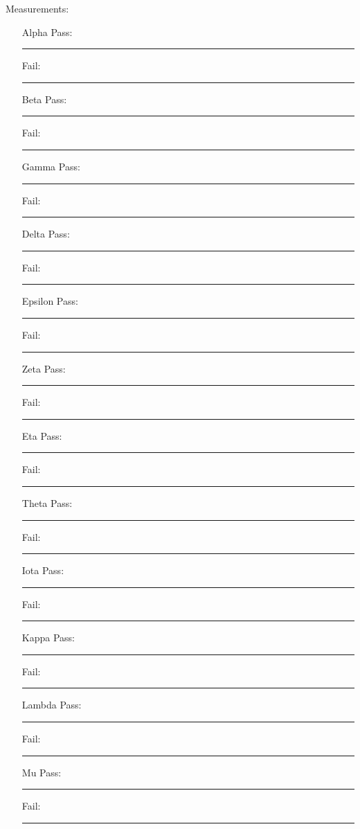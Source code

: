 \pagebreak
{\Large Measurements: }\\
\begin{enumerate}
\item[Alpha] \hfill Pass: \rule{1cm}{0.15mm} \hspace{1cm} Fail: \rule{1cm}{0.15mm}
\item[Beta] \hfill Pass: \rule{1cm}{0.15mm} \hspace{1cm} Fail: \rule{1cm}{0.15mm}
\item[Gamma] \hfill Pass: \rule{1cm}{0.15mm} \hspace{1cm} Fail: \rule{1cm}{0.15mm}
\item[Delta] \hfill Pass: \rule{1cm}{0.15mm} \hspace{1cm} Fail: \rule{1cm}{0.15mm}
\item[Epsilon] \hfill Pass: \rule{1cm}{0.15mm} \hspace{1cm} Fail: \rule{1cm}{0.15mm}
\item[Zeta] \hfill Pass: \rule{1cm}{0.15mm} \hspace{1cm} Fail: \rule{1cm}{0.15mm}
\item[Eta] \hfill Pass: \rule{1cm}{0.15mm} \hspace{1cm} Fail: \rule{1cm}{0.15mm}
\item[Theta] \hfill Pass: \rule{1cm}{0.15mm} \hspace{1cm} Fail: \rule{1cm}{0.15mm}
\item[Iota] \hfill Pass: \rule{1cm}{0.15mm} \hspace{1cm} Fail: \rule{1cm}{0.15mm}
\item[Kappa] \hfill Pass: \rule{1cm}{0.15mm} \hspace{1cm} Fail: \rule{1cm}{0.15mm}
\item[Lambda] \hfill Pass: \rule{1cm}{0.15mm} \hspace{1cm} Fail: \rule{1cm}{0.15mm}
\item[Mu] \hfill Pass: \rule{1cm}{0.15mm} \hspace{1cm} Fail: \rule{1cm}{0.15mm}
\end{enumerate}

